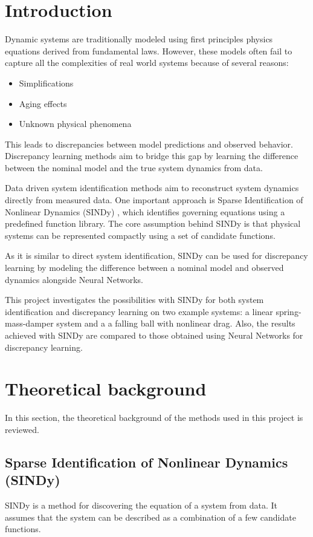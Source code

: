 ﻿\documentclass[12pt,a4paper]{article}
\begin{document}
\section{Introduction}
Dynamic systems are traditionally modeled using first principles physics equations
derived from fundamental laws. However, these models often fail to capture all the
complexities of real world systems because of several reasons:
\begin{itemize}
    \item Simplifications
    \item Aging effects
    \item Unknown physical phenomena
\end{itemize}
This leads to discrepancies between model predictions and observed behavior.
Discrepancy learning methods aim to bridge this gap by learning 
the difference between the nominal model and the true system dynamics from data.\par

Data driven system identification methods aim to reconstruct system dynamics directly
from measured data. One important approach is Sparse Identification of Nonlinear Dynamics
(SINDy) \cite{SINDy2016}, which identifies governing equations using a predefined
function library. The core assumption behind SINDy is that physical systems can be represented compactly 
using a set of candidate functions.\par

As it is similar to direct system identification, SINDy can be used for discrepancy learning by modeling
the difference between a nominal model and observed dynamics alongside Neural Networks.\par

This project investigates the possibilities with SINDy for both system identification and
discrepancy learning on two example systems: a linear spring-mass-damper system and a
a falling ball with nonlinear drag. Also, the results achieved
with SINDy are compared to those obtained using Neural Networks for discrepancy learning.\par

\newpage

\section{Theoretical background}
In this section, the theoretical background of the methods used in this project is reviewed.
\subsection{Sparse Identification of Nonlinear Dynamics (SINDy) \cite{SINDy2016}}
SINDy is a method for discovering the equation of a system from data. It assumes that the system
can be described as a combination of a few candidate functions.\par
\end{document}
